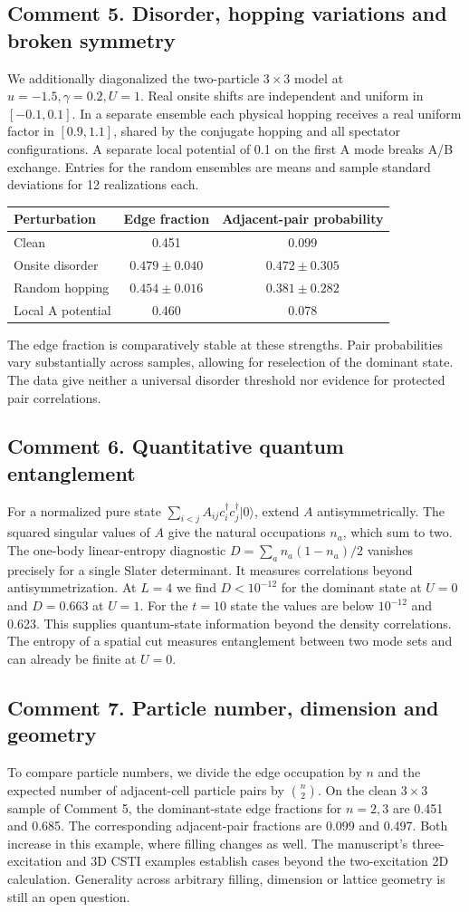 \documentclass[11pt]{article}
\newcommand{\issue}[2]{\subsection*{Comment #1. #2}}
\begin{document}
\issue{5}{Disorder, hopping variations and broken symmetry}
We additionally diagonalized the two-particle $3\times3$ model at $u=-1.5,\gamma=0.2,U=1$. Real onsite shifts are independent and uniform in $[-0.1,0.1]$. In a separate ensemble each physical hopping receives a real uniform factor in $[0.9,1.1]$, shared by the conjugate hopping and all spectator configurations. A separate local potential of 0.1 on the first A mode breaks A/B exchange. Entries for the random ensembles are means and sample standard deviations for 12 realizations each.
\begin{center}\begin{tabular}{lcc}\toprule
Perturbation & Edge fraction & Adjacent-pair probability\\\midrule
Clean &0.451&0.099\\
Onsite disorder &$0.479\pm0.040$&$0.472\pm0.305$\\
Random hopping &$0.454\pm0.016$&$0.381\pm0.282$\\
Local A potential &0.460&0.078\\\bottomrule
\end{tabular}\end{center}
The edge fraction is comparatively stable at these strengths. Pair probabilities vary substantially across samples, allowing for reselection of the dominant state. The data give neither a universal disorder threshold nor evidence for protected pair correlations.

\issue{6}{Quantitative quantum entanglement}
For a normalized pure state $\sum_{i<j} A_{ij}c_i^\dagger c_j^\dagger|0\rangle$, extend $A$ antisymmetrically. The squared singular values of $A$ give the natural occupations $n_a$, which sum to two. The one-body linear-entropy diagnostic $D=\sum_a n_a(1-n_a)/2$ vanishes precisely for a single Slater determinant. It measures correlations beyond antisymmetrization. At $L=4$ we find $D<10^{-12}$ for the dominant state at $U=0$ and $D=0.663$ at $U=1$. For the $t=10$ state the values are below $10^{-12}$ and 0.623. This supplies quantum-state information beyond the density correlations. The entropy of a spatial cut measures entanglement between two mode sets and can already be finite at $U=0$.

\issue{7}{Particle number, dimension and geometry}
To compare particle numbers, we divide the edge occupation by $n$ and the expected number of adjacent-cell particle pairs by $\binom n2$. On the clean $3\times3$ sample of Comment 5, the dominant-state edge fractions for $n=2,3$ are 0.451 and 0.685. The corresponding adjacent-pair fractions are 0.099 and 0.497. Both increase in this example, where filling changes as well. The manuscript's three-excitation and 3D CSTI examples establish cases beyond the two-excitation 2D calculation. Generality across arbitrary filling, dimension or lattice geometry is still an open question.
\end{document}
